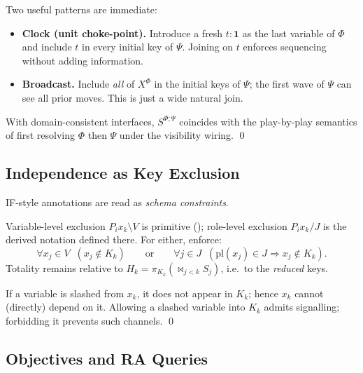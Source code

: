 Two useful patterns are immediate:

\begin{itemize}
\item \textbf{Clock (unit choke-point).} Introduce a fresh $t:\mathbf{1}$ as
the last variable of $\Phi$ and include $t$ in every initial key of $\Psi$.
Joining on $t$ enforces sequencing without adding information.
\item \textbf{Broadcast.} Include \emph{all} of $X^\Phi$ in the initial keys
of $\Psi$; the first wave of $\Psi$ can see all prior moves.  This is just a
wide natural join.
\end{itemize}

\begin{proposition}
With domain-consistent interfaces, $S^{\Phi;\Psi}$ coincides with the
play-by-play semantics of first resolving $\Phi$ then $\Psi$ under the
visibility wiring.  \qed
\end{proposition}

\subsection{Independence as Key Exclusion}\label{subsec:ra-independence}

IF-style annotations are read as \emph{schema constraints}.

\begin{definition}
Variable-level exclusion $P_i x_k \setminus V$ is primitive
(); role-level exclusion $P_i x_k / J$ is the derived
notation defined there. For either, enforce:
\[
  \forall x_j\in V \;\; (x_j \notin K_k)
  \qquad\text{or}\qquad
  \forall j\in J \;\; (\mathrm{pl}(x_j)\in J \Rightarrow x_j \notin K_k).
\]
Totality remains relative to $H_k=\pi_{K_k}(\Join_{j<k} S_j)$, i.e.\ to the
\emph{reduced} keys.
\end{definition}

\begin{remark}
If a variable is slashed from $x_k$, it does not appear in $K_k$; hence
$x_k$ cannot (directly) depend on it.  Allowing a slashed variable into
$K_k$ admits signalling; forbidding it prevents such channels.  \qed
\end{remark}

\subsection{Objectives and RA Queries}\label{subsec:ra-queries}


